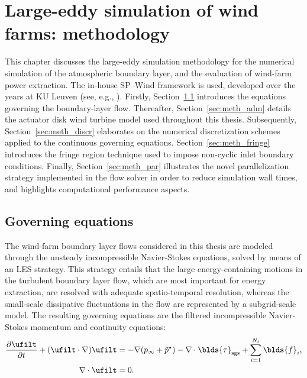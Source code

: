 \chapter{Large-eddy simulation of wind farms: methodology}\label{ch:methodology}


This chapter discusses the large-eddy simulation methodology for the numerical simulation of the atmospheric boundary layer, and the evaluation of wind-farm power extraction. The in-house SP--Wind framework is used, developed over the years at KU Leuven (see, e.g., \citealp{meyers2007evaluation, delport2009constrained, calaf2010large, goit2015optimal, allaerts2017boundary}). Firstly, Section~\ref{sec:meth_governing} introduces the equations governing the boundary-layer flow. Thereafter, Section~\ref{sec:meth_adm} details the actuator disk wind turbine model used throughout this thesis. Subsequently, Section~\ref{sec:meth_discr} elaborates on the numerical discretization schemes applied to the continuous governing equations. Section~\ref{sec:meth_fringe} introduces the fringe region technique used to impose non-cyclic inlet boundary conditions. Finally, Section~\ref{sec:meth_par} illustrates the novel parallelization strategy implemented in the flow solver in order to reduce simulation wall times, and highlights computational performance aspects. 

\section{Governing equations}\label{sec:meth_governing}
The wind-farm boundary layer flows considered in this thesis are modeled through the unsteady incompressible Navier-Stokes equations, solved by means of an LES strategy. This strategy entails that the large energy-containing motions in the turbulent boundary layer flow, which are most important for energy extraction, are resolved with adequate spatio-temporal resolution, whereas the small-scale dissipative fluctuations in the flow are represented by a subgrid-scale model. The resulting governing equations are the filtered incompressible Navier-Stokes momentum and continuity equations: 
\begin{align}
	\frac{\partial \ufilt}{\partial t} + (\ufilt \cdot \nabla) \ufilt &= -\nabla (p_\infty + \tilde{p}^\star) - \nabla \cdot \blds{\tau}_{\text{sgs}} + \sum_{i=1}^{N_t} \blds{f}_i, \label{eq:NSmomentum}\\ 
 	\nabla \cdot \ufilt &= 0. \label{eq:NScontinuity}
\end{align}


